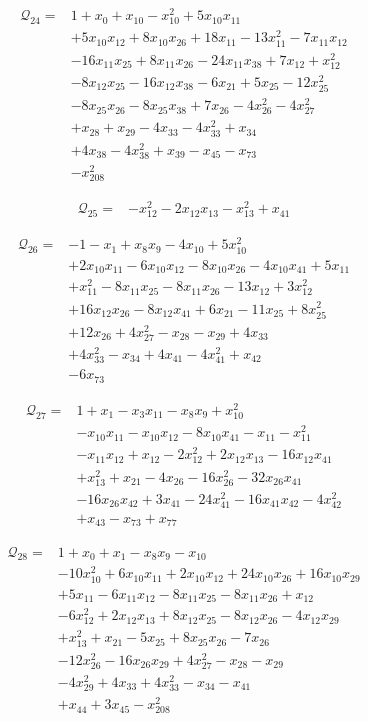 \begin{align*}
\mathcal{Q}_{24}={}&1+x_{0}+x_{10}-x_{10}^{2}+5x_{10}x_{11}\\
&+5x_{10}x_{12}+8x_{10}x_{26}+18x_{11}-13x_{11}^{2}-7x_{11}x_{12}\\
&-16x_{11}x_{25}+8x_{11}x_{26}-24x_{11}x_{38}+7x_{12}+x_{12}^{2}\\
&-8x_{12}x_{25}-16x_{12}x_{38}-6x_{21}+5x_{25}-12x_{25}^{2}\\
&-8x_{25}x_{26}-8x_{25}x_{38}+7x_{26}-4x_{26}^{2}-4x_{27}^{2}\\
&+x_{28}+x_{29}-4x_{33}-4x_{33}^{2}+x_{34}\\
&+4x_{38}-4x_{38}^{2}+x_{39}-x_{45}-x_{73}\\
&-x_{208}^{2}
\end{align*}

\begin{align*}
\mathcal{Q}_{25}={}&-x_{12}^{2}-2x_{12}x_{13}-x_{13}^{2}+x_{41}
\end{align*}

\begin{align*}
\mathcal{Q}_{26}={}&-1-x_{1}+x_{8}x_{9}-4x_{10}+5x_{10}^{2}\\
&+2x_{10}x_{11}-6x_{10}x_{12}-8x_{10}x_{26}-4x_{10}x_{41}+5x_{11}\\
&+x_{11}^{2}-8x_{11}x_{25}-8x_{11}x_{26}-13x_{12}+3x_{12}^{2}\\
&+16x_{12}x_{26}-8x_{12}x_{41}+6x_{21}-11x_{25}+8x_{25}^{2}\\
&+12x_{26}+4x_{27}^{2}-x_{28}-x_{29}+4x_{33}\\
&+4x_{33}^{2}-x_{34}+4x_{41}-4x_{41}^{2}+x_{42}\\
&-6x_{73}
\end{align*}

\begin{align*}
\mathcal{Q}_{27}={}&1+x_{1}-x_{3}x_{11}-x_{8}x_{9}+x_{10}^{2}\\
&-x_{10}x_{11}-x_{10}x_{12}-8x_{10}x_{41}-x_{11}-x_{11}^{2}\\
&-x_{11}x_{12}+x_{12}-2x_{12}^{2}+2x_{12}x_{13}-16x_{12}x_{41}\\
&+x_{13}^{2}+x_{21}-4x_{26}-16x_{26}^{2}-32x_{26}x_{41}\\
&-16x_{26}x_{42}+3x_{41}-24x_{41}^{2}-16x_{41}x_{42}-4x_{42}^{2}\\
&+x_{43}-x_{73}+x_{77}
\end{align*}

\begin{align*}
\mathcal{Q}_{28}={}&1+x_{0}+x_{1}-x_{8}x_{9}-x_{10}\\
&-10x_{10}^{2}+6x_{10}x_{11}+2x_{10}x_{12}+24x_{10}x_{26}+16x_{10}x_{29}\\
&+5x_{11}-6x_{11}x_{12}-8x_{11}x_{25}-8x_{11}x_{26}+x_{12}\\
&-6x_{12}^{2}+2x_{12}x_{13}+8x_{12}x_{25}-8x_{12}x_{26}-4x_{12}x_{29}\\
&+x_{13}^{2}+x_{21}-5x_{25}+8x_{25}x_{26}-7x_{26}\\
&-12x_{26}^{2}-16x_{26}x_{29}+4x_{27}^{2}-x_{28}-x_{29}\\
&-4x_{29}^{2}+4x_{33}+4x_{33}^{2}-x_{34}-x_{41}\\
&+x_{44}+3x_{45}-x_{208}^{2}
\end{align*}

